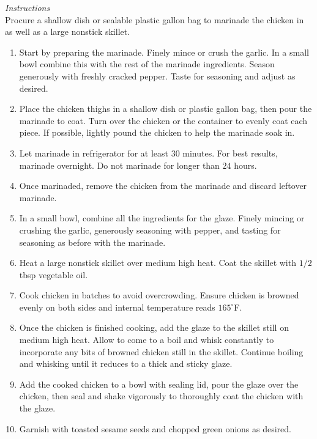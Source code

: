 \documentclass{article}
\newcommand{\instructions}[1][\Large\emph{Instructions}]{%
    \emph{#1}\\}
\newcommand{\temp}[1]{%
    $#1^\circ$F}
\begin{document}
\instructions
Procure a shallow dish or sealable plastic gallon bag to marinade the chicken in as well as a large nonstick skillet.
\begin{enumerate}
    \item Start by preparing the marinade. Finely mince or crush the garlic. In a small bowl combine this with the rest of the marinade ingredients. Season generously with freshly cracked pepper. Taste for seasoning and adjust as desired.
    \item Place the chicken thighs in a shallow dish or plastic gallon bag, then pour the marinade to coat. Turn over the chicken or the container to evenly coat each piece. If possible, lightly pound the chicken to help the marinade soak in.
    \item Let marinade in refrigerator for at least $30$ minutes. For best results, marinade overnight. Do not marinade for longer than $24$ hours.
    \item Once marinaded, remove the chicken from the marinade and discard leftover marinade.
    \item In a small bowl, combine all the ingredients for the glaze. Finely mincing or crushing the garlic, generously seasoning with pepper, and tasting for seasoning as before with the marinade.
    \item Heat a large nonstick skillet over medium high heat. Coat the skillet with $1/2$ tbsp vegetable oil.
    \item Cook chicken in batches to avoid overcrowding. Ensure chicken is browned evenly on both sides and internal temperature reads \temp{165}.
    \item Once the chicken is finished cooking, add the glaze to the skillet still on medium high heat. Allow to come to a boil and whisk constantly to incorporate any bits of browned chicken still in the skillet. Continue boiling and whisking until it reduces to a thick and sticky glaze.
    \item Add the cooked chicken to a bowl with sealing lid, pour the glaze over the chicken, then seal and shake vigorously to thoroughly coat the chicken with the glaze.
    \item Garnish with toasted sesame seeds and chopped green onions as desired.
\end{enumerate}
\newpage
\end{document}
